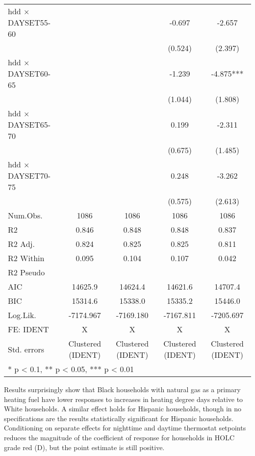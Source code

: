 \documentclass[
]{article}
\begin{document}
\begin{table}[H]
\begin{tabular}[t]{lcccc}
hdd × DAYSET55-60 &  &  & -0.697 & -2.657\\
 &  &  & (0.524) & (2.397)\\
hdd × DAYSET60-65 &  &  & -1.239 & -4.875***\\
 &  &  & (1.044) & (1.808)\\
hdd × DAYSET65-70 &  &  & 0.199 & -2.311\\
 &  &  & (0.675) & (1.485)\\
hdd × DAYSET70-75 &  &  & 0.248 & -3.262\\
 &  &  & (0.575) & (2.613)\\
\midrule
Num.Obs. & 1086 & 1086 & 1086 & 1086\\
R2 & 0.846 & 0.848 & 0.848 & 0.837\\
R2 Adj. & 0.824 & 0.825 & 0.825 & 0.811\\
R2 Within & 0.095 & 0.104 & 0.107 & 0.042\\
R2 Pseudo &  &  &  & \\
AIC & 14625.9 & 14624.4 & 14621.6 & 14707.4\\
BIC & 15314.6 & 15338.0 & 15335.2 & 15446.0\\
Log.Lik. & -7174.967 & -7169.180 & -7167.811 & -7205.697\\
FE: IDENT & X & X & X & X\\
Std. errors & Clustered (IDENT) & Clustered (IDENT) & Clustered (IDENT) & Clustered (IDENT)\\
\bottomrule
\multicolumn{5}{l}{\textsuperscript{} * p < 0.1, ** p < 0.05, *** p < 0.01}\\
\end{tabular}
\end{table}

Results surprisingly show that Black households with natural gas as a
primary heating fuel have lower responses to increases in heating degree
days relative to White households. A similar effect holds for Hispanic
households, though in no specifications are the results statistically
significant for Hispanic households. Conditioning on separate effects
for nighttime and daytime thermostat setpoints reduces the magnitude of
the coefficient of response for households in HOLC grade red (D), but
the point estimate is still positive.
\end{document}
